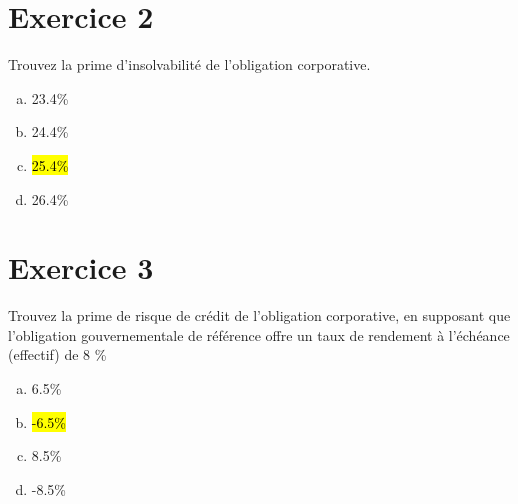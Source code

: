 \documentclass[10pt,a4paper]{article}
\begin{document}
\section*{Exercice 2}
Trouvez la prime d’insolvabilité de l'obligation corporative.
\begin{enumerate}[a)]
\item 23.4\%
\item 24.4\%
\item \hl{25.4\%}
\item 26.4\%
\end{enumerate}

\section*{Exercice 3}
Trouvez la prime de risque de crédit de l'obligation corporative,  en supposant que l’obligation gouvernementale de référence offre un taux de rendement à l’échéance (effectif) de 8 \%
\begin{enumerate}[a)]
\item 6.5\%
\item \hl{-6.5\%}
\item 8.5\%
\item -8.5\%
\end{enumerate}
\end{document}
